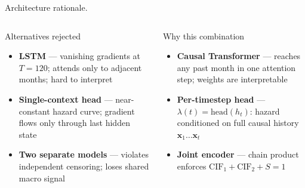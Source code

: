 \documentclass[10pt,aspectratio=169]{beamer}
\begin{document}
\begin{frame}{Architecture rationale.}
    \begin{columns}[T,onlytextwidth]
        \begin{alertblock}{Alternatives rejected}
        \small
        \begin{itemize}\itemsep4pt
            \item \textbf{LSTM} --- vanishing gradients at $T{=}120$; attends only to adjacent months; hard to interpret
            \item \textbf{Single-context head} --- near-constant hazard curve; gradient flows only through last hidden state
            \item \textbf{Two separate models} --- violates independent censoring; loses shared macro signal
        \end{itemize}
        \end{alertblock}

        \begin{block}{Why this combination}
        \small
        \begin{itemize}\itemsep4pt
            \item \textbf{Causal Transformer} --- reaches any past month in one attention step; weights are interpretable
            \item \textbf{Per-timestep head} --- $\lambda(t){=}\text{head}(h_t)$: hazard conditioned on full causal history $\mathbf{x}_1\!\dots\mathbf{x}_t$
            \item \textbf{Joint encoder} --- chain product enforces $\text{CIF}_1{+}\text{CIF}_2{+}S{=}1$
        \end{itemize}
        \end{block}
    \end{columns}
\end{frame}
\end{document}
